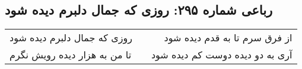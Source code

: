\begin{center}
\section*{رباعی شماره ۲۹۵: روزی که جمال دلبرم دیده شود}
\label{sec:sh295}
\begin{longtable}{l p{0.5cm} r}
روزی که جمال دلبرم دیده شود
&&
از فرق سرم تا به قدم دیده شود
\\
تا من به هزار دیده رویش نگرم
&&
آری به دو دیده دوست کم دیده شود
\\
\end{longtable}
\end{center}
